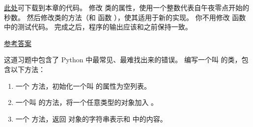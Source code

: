 \begin{exercise}

\href{http://thinkpython2.com/code/Time2.py}{此处}可下载到本章的代码。
修改  类的属性，使用一个整数代表自午夜零点开始的秒数。
然后修改类的方法（和  函数 ），使其适用于新的实现。
你不用修改  函数中的测试代码。  完成之后，程序的输出应该和之前保持一致。

\href{http://thinkpython2.com/code/Time2_soln.py}{参考答案}

\end{exercise}


\begin{exercise}
\label{kangaroo}


这道习题中包含了 Python 中最常见、最难找出来的错误。
编写一个叫  的类，包含以下方法：

\begin{enumerate}


\item 一个  方法，初始化一个叫  的属性为空列表。

\item 一个叫  的方法，将一个任意类型的对象加入 。

\item 一个  方法，返回  对象的字符串表示和  中的内容。

\end{enumerate}

%


\end{exercise}
